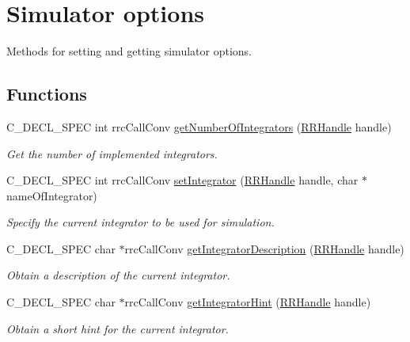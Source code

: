 \hypertarget{group__simopts}{}\section{Simulator options}
\label{group__simopts}


Methods for setting and getting simulator options.  


\subsection*{Functions}
\begin{DoxyCompactItemize}
\item 
C\+\_\+\+D\+E\+C\+L\+\_\+\+S\+P\+E\+C int rrc\+Call\+Conv \hyperlink{group__simopts_ga0e60dc15106edf34142fa7b2160f4684}{get\+Number\+Of\+Integrators} (\hyperlink{rrc__types_8h_a1d68f0592372208fa5a5f2799ea4b3ae}{R\+R\+Handle} handle)
\begin{DoxyCompactList}\small\item\em Get the number of implemented integrators. \end{DoxyCompactList}\item 
C\+\_\+\+D\+E\+C\+L\+\_\+\+S\+P\+E\+C int rrc\+Call\+Conv \hyperlink{group__simopts_gaea74da31e6dcaa4833bb6773d964aab4}{set\+Integrator} (\hyperlink{rrc__types_8h_a1d68f0592372208fa5a5f2799ea4b3ae}{R\+R\+Handle} handle, char $\ast$name\+Of\+Integrator)
\begin{DoxyCompactList}\small\item\em Specify the current integrator to be used for simulation. \end{DoxyCompactList}\item 
C\+\_\+\+D\+E\+C\+L\+\_\+\+S\+P\+E\+C char $\ast$rrc\+Call\+Conv \hyperlink{group__simopts_ga2049931879007c6df1bdb5dbb508b5fa}{get\+Integrator\+Description} (\hyperlink{rrc__types_8h_a1d68f0592372208fa5a5f2799ea4b3ae}{R\+R\+Handle} handle)
\begin{DoxyCompactList}\small\item\em Obtain a description of the current integrator. \end{DoxyCompactList}\item 
C\+\_\+\+D\+E\+C\+L\+\_\+\+S\+P\+E\+C char $\ast$rrc\+Call\+Conv \hyperlink{group__simopts_ga8bd6ff2828f0d12e911f713dfbba930b}{get\+Integrator\+Hint} (\hyperlink{rrc__types_8h_a1d68f0592372208fa5a5f2799ea4b3ae}{R\+R\+Handle} handle)
\begin{DoxyCompactList}\small\item\em Obtain a short hint for the current integrator. \end{DoxyCompactList}\item 

\end{DoxyCompactItemize}
